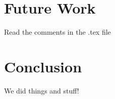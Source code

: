 


\section{Future Work}
	\label{sec:FutureStuff}
	Read the comments in the .tex file

\section{Conclusion}
	\label{sec:Conclusionn}
	We did things and stuff!